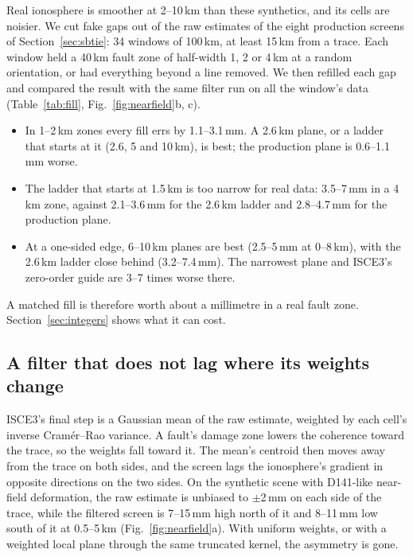 Real ionosphere is smoother at 2--10\,km than these synthetics, and its cells are noisier. We cut fake gaps out of
the raw estimates of the eight production screens of Section~\ref{sec:sbtie}: 34 windows of 100\,km, at least 15\,km
from a trace. Each window held a 40\,km fault zone of half-width 1, 2 or 4\,km at a random orientation, or had
everything beyond a line removed. We then refilled each gap and compared the result with the same filter run on all the
window's data (Table~\ref{tab:fill}, Fig.~\ref{fig:nearfield}b, c).
\begin{itemize}
  \item In 1--2\,km zones every fill errs by 1.1--3.1\,mm. A 2.6\,km plane, or a ladder that starts at it (2.6, 5 and
        10\,km), is best; the production plane is 0.6--1.1\,mm worse.
  \item The ladder that starts at 1.5\,km is too narrow for real data: 3.5--7\,mm in a 4\,km zone, against 2.1--3.6\,mm
        for the 2.6\,km ladder and 2.8--4.7\,mm for the production plane.
  \item At a one-sided edge, 6--10\,km planes are best (2.5--5\,mm at 0--8\,km), with the 2.6\,km ladder close behind
        (3.2--7.4\,mm). The narrowest plane and ISCE3's zero-order guide are 3--7 times worse there.
\end{itemize}
A matched fill is therefore worth about a millimetre in a real fault zone. Section~\ref{sec:integers} shows what it can
cost.

\subsection{A filter that does not lag where its weights change}
\label{sec:order}
ISCE3's final step is a Gaussian mean of the raw estimate, weighted by each cell's inverse Cram\'er--Rao variance. A
fault's damage zone lowers the coherence toward the trace, so the weights fall toward it. The mean's centroid then
moves away from the trace on both sides, and the screen lags the ionosphere's gradient in opposite directions on the two
sides. On the synthetic scene with D141-like near-field deformation, the raw estimate is unbiased to $\pm$2\,mm on each
side of the trace, while the filtered screen is 7--15\,mm high north of it and 8--11\,mm low south of it at 0.5--5\,km
(Fig.~\ref{fig:nearfield}a). With uniform weights, or with a weighted local plane through the same truncated kernel,
the asymmetry is gone.

